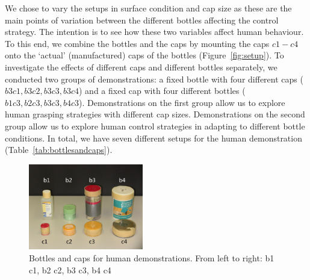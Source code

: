 We chose to vary the setups in surface condition and cap size as these
are the main points of variation between the different bottles
affecting the control strategy. The intention is to see how these two
variables affect human behaviour. To this end, we combine the bottles
and the caps by mounting the caps $c1-c4$ onto the `actual'
(manufactured) caps of the bottles (Figure~\ref{fig:setup}). To
investigate the effects of different caps and different bottles
separately, we conducted two groups of demonstrations: a fixed bottle with
four different caps ($b3c1, b3c2, b3c3, b3c4$) and a fixed cap with four
different bottles ($b1c3, b2c3, b3c3, b4c3$). Demonstrations on the
first group allow us to explore human grasping strategies with
different cap sizes. Demonstrations on the second group allow us to
explore human control strategies in adapting to different bottle
conditions. In total, we have seven different setups for the human
demonstration (Table~\ref{tab:bottlesandcaps}).


\begin{figure}
  \centering
  \includegraphics[width=5cm]{./fig/b_c.jpg}
  \caption{ \scriptsize{Bottles and caps for human demonstrations. From left to right: b1 c1, b2 c2, b3 c3, b4  c4}
}
\label{fig:b_c}
\end{figure}





